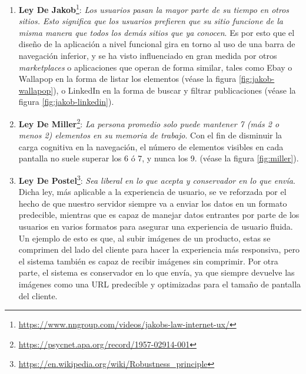 \begin{enumerate}

    \item \textbf{Ley De Jakob}\footnote{\url{https://www.nngroup.com/videos/jakobs-law-internet-ux/}}: \textit{Los usuarios pasan la mayor parte de su tiempo en otros sitios. Esto significa que los usuarios prefieren que su sitio funcione de la misma manera que todos los demás sitios que ya conocen}. Es por esto que el diseño de la aplicación a nivel funcional gira en torno al uso de una barra de navegación inferior, y se ha visto influenciado en gran medida por otros \textit{marketplaces} o aplicaciones que operan de forma similar, tales como Ebay o Wallapop en la forma de listar los elementos (véase la figura \ref{fig:jakob-wallapop}), o LinkedIn en la forma de buscar y filtrar publicaciones (véase la figura \ref{fig:jakob-linkedin}).



    \item \textbf{Ley De Miller}\footnote{\url{https://psycnet.apa.org/record/1957-02914-001}}: \textit{La persona promedio solo puede mantener 7 (más 2 o menos 2) elementos en su memoria de trabajo}. Con el fin de disminuir la carga cognitiva en la navegación, el número de elementos visibles en cada pantalla no suele superar los 6 ó 7, y nunca los 9. (véase la figura \ref{fig:miller}).


    \item \textbf{Ley De Postel}\footnote{\url{https://en.wikipedia.org/wiki/Robustness_principle}}: \textit{Sea liberal en lo que acepta y conservador en lo que envía}. Dicha ley, más aplicable a la experiencia de usuario, se ve reforzada por el hecho de que nuestro servidor siempre va a enviar los datos en un formato predecible, mientras que es capaz de manejar datos entrantes por parte de los usuarios en varios formatos para asegurar una experiencia de usuario fluida. Un ejemplo de esto es que, al subir imágenes de un producto, estas se comprimen del lado del cliente para hacer la experiencia más responsiva, pero el sistema también es capaz de recibir imágenes sin comprimir. Por otra parte, el sistema es conservador en lo que envía, ya que siempre devuelve las imágenes como una URL predecible y optimizadas para el tamaño de pantalla del cliente.


\end{enumerate}
